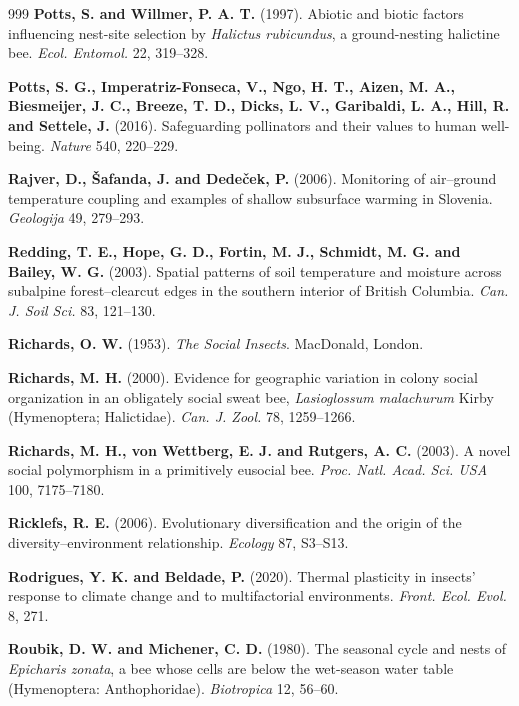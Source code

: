 \documentclass[11pt,a4paper]{article}
\begin{document}
\begin{thebibliography}{999}
\textbf{Potts, S. and Willmer, P. A. T.} (1997). Abiotic and biotic factors influencing nest-site selection by \textit{Halictus rubicundus}, a ground-nesting halictine bee. \textit{Ecol. Entomol.} 22, 319--328.

\textbf{Potts, S. G., Imperatriz-Fonseca, V., Ngo, H. T., Aizen, M. A., Biesmeijer, J. C., Breeze, T. D., Dicks, L. V., Garibaldi, L. A., Hill, R. and Settele, J.} (2016).
Safeguarding pollinators and their values to human well-being.
\textit{Nature} 540, 220--229.

\textbf{Rajver, D., {\v S}afanda, J. and Dede{\v c}ek, P.} (2006).
Monitoring of air--ground temperature coupling and examples of shallow subsurface warming in Slovenia.
\textit{Geologija} 49, 279--293.

\textbf{Redding, T. E., Hope, G. D., Fortin, M. J., Schmidt, M. G. and Bailey, W. G.} (2003).
Spatial patterns of soil temperature and moisture across subalpine forest--clearcut edges in the southern interior of British Columbia.
\textit{Can. J. Soil Sci.} 83, 121--130.

\textbf{Richards, O. W.} (1953).
\textit{The Social Insects}.
MacDonald, London.

\textbf{Richards, M. H.} (2000). Evidence for geographic variation in colony social organization in an obligately social sweat bee, \textit{Lasioglossum malachurum} Kirby (Hymenoptera; Halictidae). \textit{Can. J. Zool.} 78, 1259--1266.

\textbf{Richards, M. H., von Wettberg, E. J. and Rutgers, A. C.} (2003). A novel social polymorphism in a primitively eusocial bee. \textit{Proc. Natl. Acad. Sci. USA} 100, 7175--7180.

\textbf{Ricklefs, R. E.} (2006).
Evolutionary diversification and the origin of the diversity--environment relationship.
\textit{Ecology} 87, S3--S13.

\textbf{Rodrigues, Y. K. and Beldade, P.} (2020).
Thermal plasticity in insects' response to climate change and to multifactorial environments.
\textit{Front. Ecol. Evol.} 8, 271.

\textbf{Roubik, D. W. and Michener, C. D.} (1980).
The seasonal cycle and nests of \textit{Epicharis zonata}, a bee whose cells are below the wet-season water table (Hymenoptera: Anthophoridae).
\textit{Biotropica} 12, 56--60.


\end{thebibliography}
\end{document}
